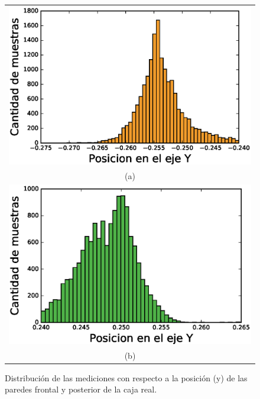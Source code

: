 \begin{figure}[ht!]
    \centering
    \begin{tabular}{c}
      \includegraphics[width=.70\textwidth]{images/ErrRegionIZQY.eps}\\
      (a)\\
      \includegraphics[width=.70\textwidth]{images/ErrRegionDERY.eps}\\
      (b)
   \end{tabular}
  \captionsetup{font=footnotesize}
    \caption{\label{f:EstadisticaY}Distribución de las mediciones con respecto a la posición (y) de las 
    paredes frontal y posterior de la caja real.}
\end{figure}


